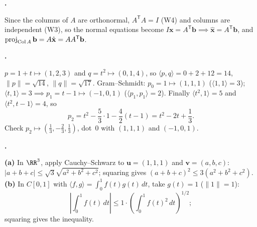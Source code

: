 \documentclass[10pt]{scrartcl}
\newcommand{\vv}[1]{\mathbf{#1}}
\newcommand{\ip}[2]{\langle #1,#2\rangle}
\begin{document}
\begin{prob}\textbf{.}\par{}
Since the columns of $A$ are orthonormal, $A^{\mathsf T}A=I$ (W4) and columns are independent (W3), so the normal equations become $I\vv x=A^{\mathsf T}\vv b \implies \hat{\vv x}=A^{\mathsf T}\vv b$, and $\proj_{\Col A}\vv b=A\hat{\vv x}=AA^{\mathsf T}\vv b$.
\end{prob}

\begin{prob}\textbf{.}\par{}
\begin{steps}
  \ii $p=1+t \mapsto (1,2,3)$ and $q=t^2 \mapsto (0,1,4)$, so $\ip{p}{q}=0+2+12=14$, $\|p\|=\sqrt{14}$, $\|q\|=\sqrt{17}$.
  \ii Gram--Schmidt: $p_0=1\mapsto(1,1,1)$ ($\ip{1}{1}=3$); $\ip{t}{1}=3 \implies p_1=t-1\mapsto(-1,0,1)$ ($\ip{p_1}{p_1}=2$). Finally $\ip{t^2}{1}=5$ and $\ip{t^2}{t-1}=4$, so
  \[
    p_2 = t^2 - \frac53\cdot 1 - \frac42(t-1) = t^2-2t+\frac13.
  \]
  Check $p_2\mapsto(\frac13,-\frac23,\frac13)$, dot~$0$ with $(1,1,1)$ and $(-1,0,1)$.
\end{steps}
\end{prob}

\begin{prob}\textbf{.}\par{}
\begin{steps}
  \ii \textbf{(a)} In $\RR^3$, apply Cauchy--Schwarz to $\vv u=(1,1,1)$ and $\vv v=(a,b,c)$: $|a+b+c|\le \sqrt{3}\sqrt{a^2+b^2+c^2}$; squaring gives $(a+b+c)^2\le 3(a^2+b^2+c^2)$.
  \ii \textbf{(b)} In $C[0,1]$ with $\ip{f}{g}=\int_0^1 f(t)g(t)\,dt$, take $g(t)=1$ ($\|1\|=1$):
    \[
      \left|\int_0^1 f(t)\,dt\right|\le 1\cdot\left(\int_0^1 f(t)^2\,dt\right)^{1/2};
    \]
    squaring gives the inequality.
\end{steps}
\end{prob}
\end{document}
